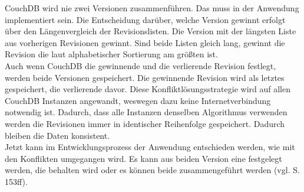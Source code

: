 CouchDB wird nie zwei Versionen zusammenführen. Das muss in der Anwendung implementiert sein.
Die Entscheidung darüber, welche Version gewinnt erfolgt über den Längenvergleich der Revisionslisten. Die Version mit der längsten Liste aus vorherigen Revisionen gewinnt. Sind beide Listen gleich lang, gewinnt die Revision die laut alphabetischer Sortierung am größten ist.\\
Auch wenn CouchDB die gewinnende und die verlierende Revision festlegt, werden beide Versionen gespeichert. Die gewinnende Revision wird als letztes gespeichert, die verlierende davor. Diese Konfliktlösungsstrategie wird auf allen CouchDB Instanzen angewandt, weswegen dazu keine Internetverbindung notwendig ist. Dadurch, dass alle Instanzen denselben Algorithmus verwenden werden die Revisionen immer in identischer Reihenfolge gespeichert. Dadurch bleiben die Daten konsistent.\\
Jetzt kann im Entwicklungsprozess der Anwendung entschieden werden, wie mit den Konflikten umgegangen wird.
Es kann aus beiden Version eine festgelegt werden, die behalten wird oder es können beide zusammengeführt werden (vgl. \cite{couchDB} S. 153ff).
%
% 
%
%
